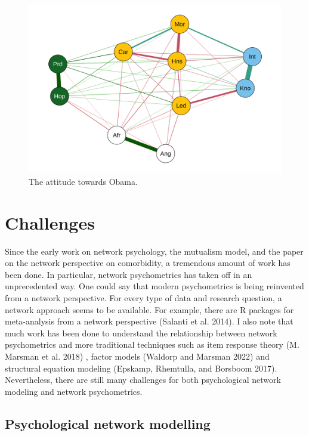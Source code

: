 \documentclass[
  a4paper,
  DIV=11,
  numbers=noendperiod,
  oneside]{scrreprt}
\begin{document}
\begin{figure}

{\centering \includegraphics{media/ch6/fig-ch6-img19-old-88.png}

}

\caption{\label{fig-ch6-img19-old-88}The attitude towards Obama.}

\end{figure}

\hypertarget{sec-Challenges}{%
\section{Challenges}\label{sec-Challenges}}

Since the early work on network psychology, the mutualism model, and the
paper on the network perspective on comorbidity, a tremendous amount of
work has been done. In particular, network psychometrics has taken off
in an unprecedented way. One could say that modern psychometrics is
being reinvented from a network perspective. For every type of data and
research question, a network approach seems to be available. For
example, there are R packages for meta-analysis from a network
perspective (Salanti et al. 2014). I also note that much work has been
done to understand the relationship between network psychometrics and
more traditional techniques such as item response theory (M. Marsman et
al. 2018) , factor models (Waldorp and Marsman 2022) and structural
equation modeling (Epskamp, Rhemtulla, and Borsboom 2017). Nevertheless,
there are still many challenges for both psychological network modeling
and network psychometrics.

\hypertarget{sec-Psychological-network-modelling}{%
\subsection{Psychological network
modelling}\label{sec-Psychological-network-modelling}}
\end{document}
